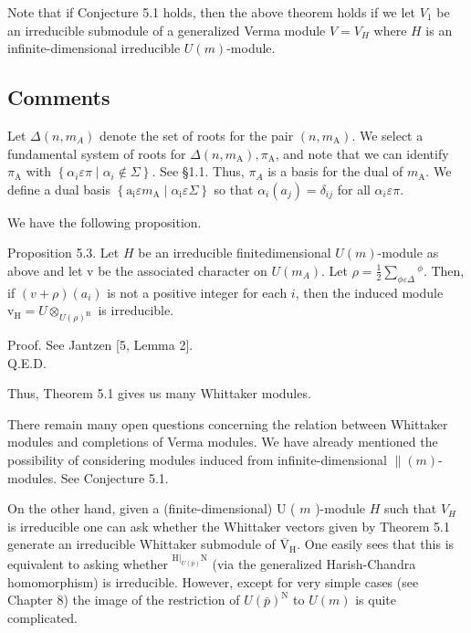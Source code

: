 \documentclass[10pt]{article}
\begin{document}
Note that if Conjecture 5.1 holds, then the above theorem holds if we let $V_{1}$ be an irreducible submodule of a generalized Verma module $V=V_{H}$ where $H$ is an infinite-dimensional irreducible $U(m)$-module.

\subsection{Comments}
Let $\Delta\left(n, m_{A}\right)$ denote the set of roots for the pair $\left(n, m_{\mathrm{A}}\right)$. We select a fundamental system of roots for $\Delta\left(n, m_{\mathrm{A}}\right), \pi_{\mathrm{A}}$, and note that we can identify $\pi_{\mathrm{A}}$ with $\left\{\alpha_{i} \varepsilon \pi \mid \alpha_{i} \notin \Sigma\right\}$. See §1.1. Thus, $\pi_{A}$ is a basis for the dual of $m_{\mathrm{A}}$. We define a dual basis $\left\{\mathrm{a}_{\mathrm{i}} \varepsilon m_{\mathrm{A}} \mid \alpha_{\mathrm{i}} \varepsilon \Sigma\right\}$ so that $\alpha_{i}\left(a_{j}\right)=\delta_{i j}$ for all $\alpha_{i} \varepsilon \pi$.

We have the following proposition.

Proposition 5.3. Let $H$ be an irreducible finitedimensional $U(m)$-module as above and let v be the associated character on $U\left(m_{A}\right)$. Let $\rho=\frac{1}{2} \sum_{\phi \varepsilon \Delta}{ }^{\phi}$. Then, if $(v+\rho)\left(a_{i}\right)$ is not a positive integer for each $i$, then the induced module $\mathrm{v}_{\mathrm{H}}=U \otimes_{U(\rho)^{\mathrm{H}}}$ is irreducible.

Proof. See Jantzen [5, Lemma 2].\\
Q.E.D.

Thus, Theorem 5.1 gives us many Whittaker modules.

There remain many open questions concerning the relation between Whittaker modules and completions of Verma modules. We have already mentioned the possibility of considering modules induced from infinite-dimensional $\|(m)$-modules. See Conjecture 5.1.

On the other hand, given a (finite-dimensional) U ( $m$ )-module $H$ such that $V_{H}$ is irreducible one can ask whether the Whittaker vectors given by Theorem 5.1 generate an irreducible Whittaker submodule of $\overline{\mathrm{V}}_{\mathrm{H}}$. One easily sees that this is equivalent to asking whether ${ }^{\left.\mathrm{H}\right|_{U(\bar{p})} \mathrm{N}}$ (via the generalized Harish-Chandra homomorphism) is irreducible. However, except for very simple cases (see Chapter 8) the image of the restriction of $U(\bar{p})^{\mathrm{N}}$ to $U(m)$ is quite complicated.
\end{document}

